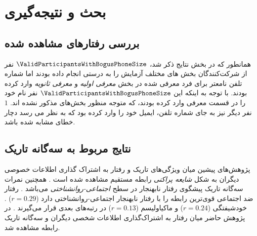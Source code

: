 \chapter{بحث و نتیجه‌گیری}
\section{بررسی رفتارهای مشاهده شده }
همانطور که در بخش نتایج ذکر شد،
$\ValidParticipantsWithBogusPhoneSize$
نفر  از شرکت‌کنندگان
بخش های مختلف آزمایش را به درستی انجام داده بودند اما شماره تلفن نامعتر
برای فرد معرفی شده در بخش‌
\textit{معرفی اولیه}
و
\textit{معرفی ثانویه}
وارد کرده بودند. با توجه به اینکه این $\ValidParticipantsWithBogusPhoneSize$
نفر نام
خود را در قسمت معرفی وارد کرده بودند، که متوجه منظور بخش‌های مذکور نشده اند.
$1$
نفر دیگر نیز به جای شماره تلفن، ایمیل خود را وارد کرده بود که به نظر می رسد دچار خطای مشابه
شده باشد.
\section{نتایج مربوط به سه‌گانه تاریک}
پژوهش‌های پیشین میان ویژگی‌های تاریک و رفتار
به اشتراک گذاری اطلاعات خصوصی دیگران به شکل
\textit{
    شایعه پراکنی
}
رابطه مستقیم مشاهده شده است
\!\citep{hartungBetterItsReputation2019}
\!.
همچنین نمرات سه‌گانه تاریک پیشگوی رفتار نابهنجار در سطح
\textit{
    اجتماعی-روانشناختی
}
می‌باشد
\!\citep{murisMalevolentSideHuman2017}
\!.
رفتار ضد اجتماعی قوی‌ترین رابطه را با رفتار نابهنجار اجتماعی-روانشناختی دارد
($r = 0.29$)
\!. خودشیفتگی
($r = 0.24$)
و ماکیاولیسم
($r = 0.13$)
در رتبه‌های بعدی قرار می‌گیرند
\!.
در پژوهش حاضر میان رفتار به اشتراک‌گذاری اطلاعات شخصی دیگران و سه‌گانه تاریک رابطه مشاهده شد.

